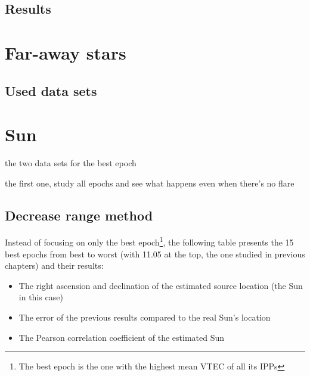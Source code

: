 \subsection{Results}

\section{Far-away stars}

\subsection{Used data sets}








\clearpage
\clearpage

\section{Sun}

the two data sets for the best epoch

the first one, study all epochs and see what happens even when there's no flare

\subsection{Decrease range method}

Instead of focusing on only the best epoch\footnote{The best epoch is the one with the highest mean VTEC of all its IPPs}, the following table presents the 15 best epochs from best to worst (with 11.05 at the top, the one studied in previous chapters) and their results: 

\begin{itemize}
	\item The right ascension and declination of the estimated source location (the Sun in this case)
	\item The error of the previous results compared to the real Sun's location
	\item The Pearson correlation coefficient of the estimated Sun
\end{itemize}

